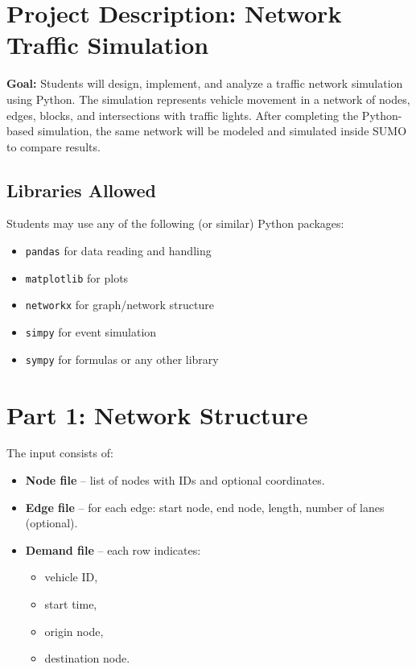 \documentclass{KPS_assignment}
\begin{document}
\maketitle

\section*{Project Description: Network Traffic Simulation}

\textbf{Goal:}  
Students will design, implement, and analyze a traffic network simulation using Python. The simulation represents vehicle movement in a network of nodes, edges, blocks, and intersections with traffic lights. After completing the Python-based simulation, the same network will be modeled and simulated inside SUMO to compare results.

\vspace{0.3cm}
\subsection*{Libraries Allowed}
Students may use any of the following (or similar) Python packages:
\begin{itemize}
    \item \texttt{pandas} for data reading and handling
    \item \texttt{matplotlib} for plots
    \item \texttt{networkx} for graph/network structure
    \item \texttt{simpy} for event simulation
    \item \texttt{sympy} for formulas or any other library
\end{itemize}

\section*{Part 1: Network Structure}

The input consists of:
\begin{itemize}
    \item \textbf{Node file} – list of nodes with IDs and optional coordinates.
    \item \textbf{Edge file} – for each edge: start node, end node, length, number of lanes (optional).
    \item \textbf{Demand file} – each row indicates:
    \begin{itemize}
        \item vehicle ID,
        \item start time,
        \item origin node,
        \item destination node.
    \end{itemize}
\end{itemize}
\end{document}
